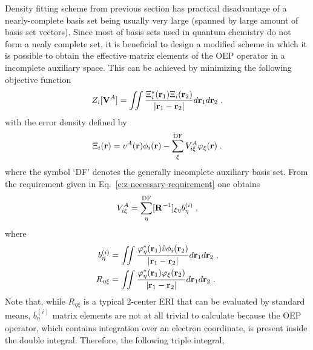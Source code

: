 Density fitting scheme from previous section has practical disadvantage of a nearly\hyp{}complete basis set
being usually very large (spanned by large amount of basis set vectors). 
Since most of basis sets used in quantum chemistry do not form a nealy complete
set, it is beneficial to design a modified scheme in which it is possible to obtain the effective 
matrix elements of the OEP operator in a incomplete auxiliary space. This can be achieved by minimizing 
the following objective function
%
\begin{equation} \label{e:z-incompl}
	Z_i[{\bf V}^A] = \iint 
        \frac{ \Xi_i^*({\bf r}_1) \Xi_i({\bf r}_2) }{\vert {\bf r}_1 - {\bf r}_2 \vert}  
         d{\bf r}_1 d{\bf r}_2  \;.
\end{equation}
%
with the error density defined by
%
\begin{equation}
 \Xi_i({\bf r}) = v^A({\bf r}) \phi_i({\bf r}) - \sum_\xi^{\rm DF} V^A_{i\xi} \varphi_\xi({\bf r}) \;.
\end{equation}
%
where the symbol `DF' denotes the generally incomplete auxiliary basis set.
From the requirement given in Eq.~\eqref{e:z-necessary-requirement}
one obtains
%
\begin{equation} \label{e:v-noncompl}
  V^A_{i\xi} = \sum_\eta^{\rm DF} [{\bf R}^{-1}]_{\xi\eta} b^{(i)}_\eta \;,
\end{equation}
%
where 
%
\begin{subequations}
\begin{align}
 b^{(i)}_\eta &= \iint 
                       \frac{ \varphi^*_\eta({\bf r}_1) \hat{v} \phi_i({\bf r}_2) } 
                            {\vert {\bf r}_1 - {\bf r}_2\vert}  
                 d{\bf r}_1 d{\bf r}_2 \;, \\
 R_{\eta\xi}  &= \iint 
                       \frac{ \varphi^*_\eta({\bf r}_1) \varphi_\xi({\bf r}_2) } 
                            {\vert {\bf r}_1 - {\bf r}_2\vert}  
                 d{\bf r}_1 d{\bf r}_2 \;.
\end{align}
\end{subequations}
%
Note that, while $R_{\eta\xi}$ is a typical 2\hyp{}center ERI 
that can be evaluated by standard means,
$b^{(i)}_\eta$ matrix elements are not at all trivial to calculate
because the OEP operator, which contains integration over an electron coordinate,
is present inside the double integral. Therefore, the following triple integral,
